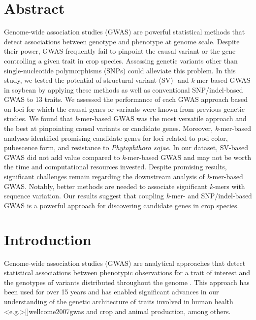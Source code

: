 \documentclass{article}
\begin{document}
\section*{Abstract}

Genome-wide association studies (GWAS) are powerful statistical methods that
detect associations between genotype and phenotype at genome scale. Despite
their power, GWAS frequently fail to pinpoint the causal variant or the gene
controlling a given trait in crop species. Assessing genetic variants other than
single-nucleotide polymorphisms (SNPs) could alleviate this problem.  In this
study, we tested the potential of structural variant (SV)- and \emph{k}-mer-based GWAS in soybean by
applying these methods as well as conventional SNP/indel-based GWAS to 13
traits. We assessed the performance of each GWAS approach based on loci for
which the causal genes or variants were known from previous genetic studies. We
found that \emph{k}-mer-based GWAS was the most versatile approach and the best
at pinpointing causal variants or candidate genes.  Moreover,
\textit{k}-mer-based analyses identified promising candidate genes for loci
related to pod color, pubescence form, and resistance to \textit{Phytophthora
sojae}. In our dataset, SV-based GWAS did not add value compared to
\textit{k}-mer-based GWAS and may not be worth the time and computational
resources invested.  Despite promising results, significant challenges remain
regarding the downstream analysis of \emph{k}-mer-based GWAS.  Notably, better
methods are needed to associate significant \emph{k}-mers with sequence
variation. Our results suggest that coupling \emph{k}-mer- and SNP/indel-based
GWAS is a powerful approach for discovering candidate genes in crop species.

\clearpage

\section*{Introduction}
Genome-wide association studies (GWAS) are analytical approaches that detect
statistical associations between phenotypic observations for a trait of
interest and the genotypes of variants distributed throughout the
genome . This approach has been used for over 15 years
 and has enabled significant advances in our understanding
of the genetic architecture of traits involved in human health
\shortcite<e.g.>[]{wellcome2007gwas} and crop  and animal
 production, among others.
\end{document}
